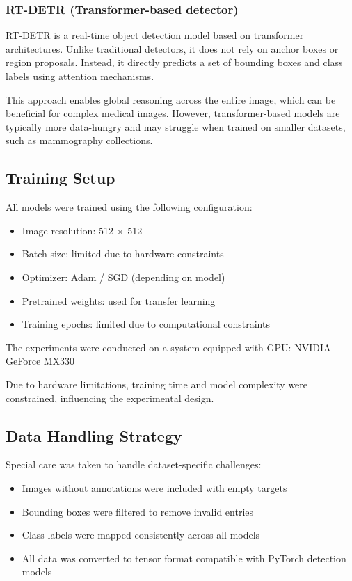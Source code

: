 \documentclass[12pt,a4paper]{article} %
\begin{document}
\subsubsection{RT-DETR (Transformer-based detector)}
RT-DETR is a real-time object detection model based on transformer architectures. Unlike traditional detectors, it does not rely on anchor boxes or region proposals. Instead, it directly predicts a set of bounding boxes and class labels using attention mechanisms.

This approach enables global reasoning across the entire image, which can be beneficial for complex medical images. However, transformer-based models are typically more data-hungry and may struggle when trained on smaller datasets, such as mammography collections.

\subsection{Training Setup}
All models were trained using the following configuration:
\begin{itemize}
  \item Image resolution: 512 × 512
  \item Batch size: limited due to hardware constraints
  \item Optimizer: Adam / SGD (depending on model)
  \item Pretrained weights: used for transfer learning
  \item Training epochs: limited due to computational constraints
\end{itemize}

The experiments were conducted on a system equipped with GPU: NVIDIA GeForce MX330

Due to hardware limitations, training time and model complexity were constrained, influencing the experimental design.

\subsection{Data Handling Strategy}
Special care was taken to handle dataset-specific challenges:
\begin{itemize}
  \item Images without annotations were included with empty targets
  \item Bounding boxes were filtered to remove invalid entries
  \item Class labels were mapped consistently across all models
  \item All data was converted to tensor format compatible with PyTorch detection models
\end{itemize}
\end{document}
